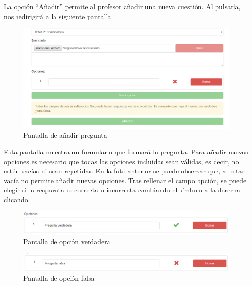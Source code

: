 \documentclass[openright,twoside,10pt]{book}
\begin{document}
    La opción \enquote{Añadir} permite al profesor añadir una nueva
    cuestión. Al pulsarla, nos redirigirá a la siguiente pantalla.
    
    \begin{figure}[H]
        \begin{center}
            \includegraphics[width=\textwidth]{img/manual/profesor-test3-aniadir.png}
        \end{center}
        \caption{Pantalla de añadir pregunta}
    \end{figure}
    
    Esta pantalla muestra un formulario que formará la pregunta. Para añadir
    nuevas opciones es necesario que todas las opciones incluidas sean
    válidas, es decir, no estén vacías ni sean repetidas. En la foto
    anterior se puede observar que, al estar vacía no permite añadir nuevas
    opciones. Tras rellenar el campo opción, se puede elegir si la respuesta
    es correcta o incorrecta cambiando el símbolo a la derecha clicando.
    
    \begin{figure}[H]
        \begin{center}
            \includegraphics[width=\textwidth]{img/manual/opcion-verdadera.png}
        \end{center}
        \caption{Pantalla de opción verdadera}
    \end{figure}
    
    \begin{figure}[H]
        \begin{center}
            \includegraphics[width=\textwidth]{img/manual/opcion-falsa.png}
        \end{center}
        \caption{Pantalla de opción falsa}
    \end{figure}
    
\end{document}
